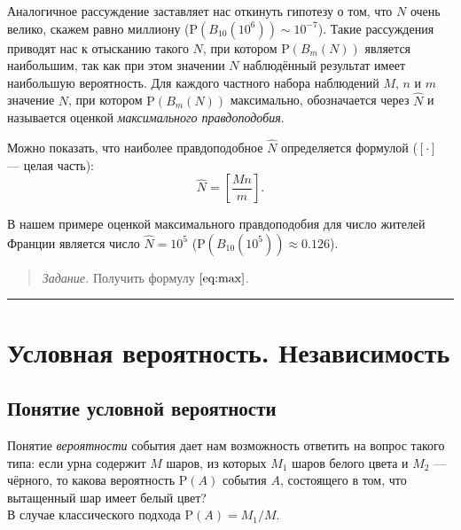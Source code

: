 \documentclass[11pt,a4paper]{article}
\renewcommand{\linethickness}{0.1ex}
\begin{document}
Аналогичное рассуждение заставляет нас откинуть гипотезу о том, что
\(N\) очень велико, скажем равно миллиону
(\(\mathrm{P}(B_{10}(10^6)) \sim 10^{-7}\)). Такие рассуждения приводят
нас к отысканию такого \(N\), при котором \(\mathrm{P}(B_m(N))\)
является наибольшим, так как при этом значении \(N\) наблюдённый
результат имеет наибольшую вероятность. Для каждого частного набора
наблюдений \(M\), \(n\) и \(m\) значение \(N\), при котором
\(\mathrm{P}(B_m(N))\) максимально, обозначается через \(\hat{N}\) и
называется оценкой \emph{максимального правдоподобия}.

Можно показать, что наиболее правдоподобное \(\hat{N}\) определяется
формулой (\([\cdot]\) --- целая часть):
\[ \hat{N} = \left[\dfrac{Mn}{m}\right]. \tag{2}\label{eq:max} \]

В нашем примере оценкой максимального правдоподобия для число жителей
Франции является число \(\hat{N} = 10^5\)
(\(\mathrm{P}(B_{10}(10^5)) \approx 0.126\)).

\begin{quote}
\emph{Задание.} Получить формулу \(\eqref{eq:max}\).
\end{quote}

    \begin{center}\rule{0.5\linewidth}{\linethickness}\end{center}

    \hypertarget{ux443ux441ux43bux43eux432ux43dux430ux44f-ux432ux435ux440ux43eux44fux442ux43dux43eux441ux442ux44c.-ux43dux435ux437ux430ux432ux438ux441ux438ux43cux43eux441ux442ux44c}{%
\section{Условная вероятность.
Независимость}\label{ux443ux441ux43bux43eux432ux43dux430ux44f-ux432ux435ux440ux43eux44fux442ux43dux43eux441ux442ux44c.-ux43dux435ux437ux430ux432ux438ux441ux438ux43cux43eux441ux442ux44c}}

\hypertarget{ux43fux43eux43dux44fux442ux438ux435-ux443ux441ux43bux43eux432ux43dux43eux439-ux432ux435ux440ux43eux44fux442ux43dux43eux441ux442ux438}{%
\subsection{Понятие условной
вероятности}\label{ux43fux43eux43dux44fux442ux438ux435-ux443ux441ux43bux43eux432ux43dux43eux439-ux432ux435ux440ux43eux44fux442ux43dux43eux441ux442ux438}}

Понятие \emph{вероятности} события дает нам возможность ответить на
вопрос такого типа: если урна содержит \(M\) шаров, из которых \(M_1\)
шаров белого цвета и \(M_2\) --- чёрного, то какова вероятность
\(\mathrm{P}(A)\) события \(A\), состоящего в том, что вытащенный шар
имеет белый цвет?\\
В случае классического подхода \(\mathrm{P}(A) =M_1/M\).
\end{document}
